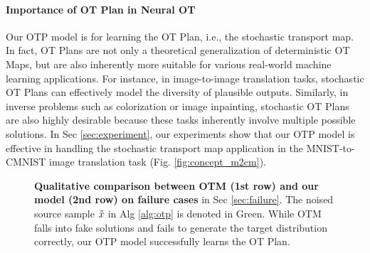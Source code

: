 \paragraph{Importance of OT Plan in Neural OT}
Our OTP model is for learning the OT Plan, i.e., the stochastic transport map. In fact, OT Plans are not only a theoretical generalization of deterministic OT Maps, but are also inherently more suitable for various real-world machine learning applications. For instance, in image-to-image translation tasks, stochastic OT Plans can effectively model the diversity of plausible outputs. Similarly, in inverse problems such as colorization or image inpainting, stochastic OT Plans are also highly desirable because these tasks inherently involve multiple possible solutions. In Sec \ref{sec:experiment}, our experiments show that our OTP model is effective in handling the stochastic transport map application in the MNIST-to-CMNIST image translation task (Fig. \ref{fig:concept_m2cm}).

\begin{figure*}[t]
    \centering 
    \quad
    \quad
    \quad
    \vspace{-10pt}
    \caption{\textbf{Qualitative comparison between OTM (1st row) and our model (2nd row) on failure cases} in Sec \ref{sec:failure}. The noised source sample $\Tilde{x}$ in Alg \ref{alg:otp} is denoted in Green. While OTM falls into fake solutions and fails to generate the target distribution correctly, our OTP model successfully learns the OT Plan. 
    }
    \label{fig:fail_case_model}
    \vspace{-10pt}
\end{figure*}

